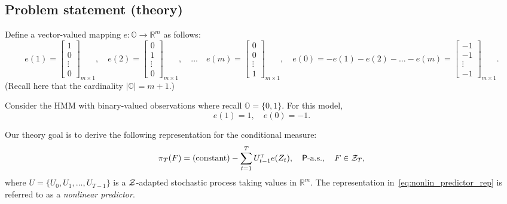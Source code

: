 \documentclass[twoside,11pt]{article}
\def\Re{\mathbb{R}}
\newcommand{\field}[1]{\mathbb{#1}}
\def\Re{\field{R}}
\def\transpose{{\hbox{\rm\tiny T}}}
\def\clZ{{\cal Z}}
\def\clZ{{\cal Z}}
\def\Re{\mathbb{R}}
\def\clZ{{\cal Z}}
\renewcommand{\Re}{\mathbb{R}}
\def\clZ{{\cal Z}}
\def\bO{\mathbb{O}}
\def\sP{{\sf P}}
\begin{document}
\subsection{Problem statement (theory)}

Define a vector-valued mapping $e:\bO\to \Re^m$ as follows:
\begin{equation*}
  e(1) = \begin{bmatrix} 1 \\ 0 \\ \vdots \\ 0 \end{bmatrix}_{m\times 1},\quad e(2) = \begin{bmatrix} 0 \\ 1\\ \vdots\\ 0 \end{bmatrix}_{m\times 1}, \quad \hdots \quad e(m)= \begin{bmatrix} 0 \\ 0 \\ \vdots \\ 1 \end{bmatrix}_{m\times 1}, \quad e(0) = -e(1) -e(2) - \hdots -e(m)= \begin{bmatrix} -1 \\ -1\\ \vdots \\ -1 \end{bmatrix}_{m\times 1}.
\end{equation*}
(Recall here that the cardinality $|\bO| = m+1$.)  

\begin{example}[m=1]
  Consider the HMM with binary-valued observations where recall $\bO =
  \{0,1\}$.  For this model,
  \begin{equation*}
    e(1) = 1,\quad e(0) = -1.
  \end{equation*}
\end{example}

Our theory goal is to derive the following representation for the
conditional measure:
\begin{equation}\label{eq:nonlin_predictor_rep}
  \pi_T(F) = \text{(constant)} - \sum_{t=1}^{T} U_{t-1}^\transpose e(Z_t),\quad \sP\text{-a.s.},\quad F\in\clZ_T,
\end{equation}
where $U=\{U_0,U_1,\hdots,U_{T-1}\}$ is a $\clZ$-adapted stochastic process taking values in $\Re^m$.  
The representation in~\eqref{eq:nonlin_predictor_rep} is referred to as a {\em nonlinear predictor}.
\end{document}
